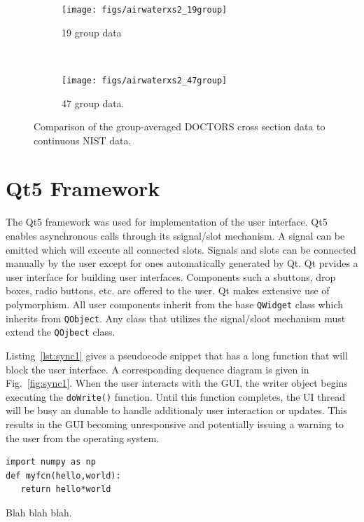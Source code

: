 \begin{figure}
    \centering
    \begin{subfigure}[b]{0.45\textwidth}
        \texttt{[image: figs/airwaterxs2\_19group]}
        \caption{19 group data}
        \label{fig:airwaterxs2_19group}
    \end{subfigure}
    ~
    \begin{subfigure}[b]{0.45\textwidth}
        \texttt{[image: figs/airwaterxs2\_47group]}
        \caption{47 group data.}
        \label{fig:airwaterxs2_47group}
    \end{subfigure}
    \caption{Comparison of the group-averaged DOCTORS cross section data to continuous NIST data.}\label{fig:airwaterxs_group}
\end{figure}

\section{Qt5 Framework}\label{sec:qt}
The Qt5 framework was used for implementation of the user interface. Qt5 enables asynchronous calls through its ssignal/slot mechanism. A signal can be emitted which will execute all connected slots. Signals and slots can be connected manually by the user except for ones automatically generated by Qt. Qt prvides a user interface for building user interfaces. Components such a sbuttons, drop boxes, radio buttons, etc. are offered to the user. Qt makes extensive use of polymorphism. All user components inherit from the base \texttt{QWidget} class which inherits from \texttt{QObject}. Any class that utilizes the signal/sloot mechanism must extend the \texttt{QOjbect} class.

Listing~\ref{lst:sync1} gives a pseudocode snippet that has a long function that will block the user interface. A corresponding dequence diagram is given in Fig.~\ref{fig:sync1}. When the user interacts with the GUI, the writer object begins executing the \texttt{doWrite()} function. Until this function completes, the UI thread will be busy an dunable to handle additionaly user interaction or updates. This results in the GUI becoming unresponsive and potentially issuing a warning to the user from the operating system.

\begin{listing}
\begin{verbatim}
import numpy as np
def myfcn(hello,world):
   return hello*world
\end{verbatim}
\caption{Blah blah blah.}\label{lst:sync1}
\end{listing}

